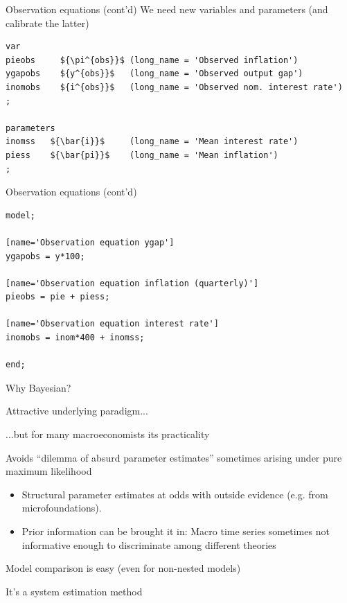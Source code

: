 \begin{frame}[fragile]{Observation equations (cont'd)}
We need new variables and parameters (and calibrate the latter)
\begin{verbatim}
var
pieobs     ${\pi^{obs}}$ (long_name = 'Observed inflation')
ygapobs    ${y^{obs}}$   (long_name = 'Observed output gap')
inomobs    ${i^{obs}}$   (long_name = 'Observed nom. interest rate')
;

parameters
inomss   ${\bar{i}}$     (long_name = 'Mean interest rate')
piess    ${\bar{pi}}$    (long_name = 'Mean inflation')
;
\end{verbatim}
\end{frame}

\begin{frame}[fragile]{Observation equations (cont'd)}
\begin{verbatim}
model;

[name='Observation equation ygap']
ygapobs = y*100;

[name='Observation equation inflation (quarterly)']
pieobs = pie + piess;

[name='Observation equation interest rate']
inomobs = inom*400 + inomss;

end;
\end{verbatim}
\end{frame}




\begin{frame}{Why Bayesian?}
\begin{wideitemize}
\item Attractive underlying paradigm...
\item ...but for many macroeconomists its practicality
\item Avoids ``dilemma of absurd parameter estimates'' sometimes arising under pure maximum likelihood
\begin{itemize}
\item Structural parameter estimates at odds with outside evidence (e.g. from microfoundations).
\item Prior information can be brought it in: Macro time series sometimes not informative enough to discriminate among different theories
\end{itemize}
\item Model comparison is easy (even for non-nested models)
\item It's a system estimation method 
\end{wideitemize}
\end{frame}

